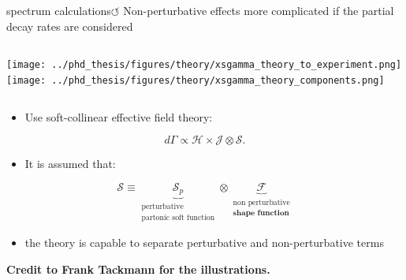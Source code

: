 \documentclass[xcolor=dvipsnames]{beamer}
\begin{document}
\begin{frame}{\safeBtoXsdgamma spectrum calculations\hyperlink{frame:A}{$\circlearrowleft$}}
   \scriptsize
      Non-perturbative effects more complicated if the partial decay rates are considered
   
      \begin{columns}
         \texttt{[image: ../phd\_thesis/figures/theory/xsgamma\_theory\_to\_experiment.png]}
         \texttt{[image: ../phd\_thesis/figures/theory/xsgamma\_theory\_components.png]}
      \end{columns}
   
      \begin{itemize}
         \item Use soft-collinear effective field theory:
      \end{itemize}
      \begin{equation}\nonumber
         d\Gamma \propto \mathcal{H} \times \mathcal{J} \otimes \mathcal{S}.
     \end{equation}

     \vspace{-10pt}
     \begin{itemize}
      \item It is assumed that:
     \end{itemize}
     \begin{equation}\nonumber
      \mathcal{S} \equiv \underbrace{\mathcal{S}_p}_{\substack{\text{perturbative}\\\text{partonic soft function}}} \otimes \underbrace{\mathcal{F}}_{\substack{\text{non perturbative}\\\textbf{shape function}}}
     \end{equation}
     \begin{itemize}
      \item[\ra] the theory is capable to separate perturbative and non-perturbative terms 
     \end{itemize}

   \vspace{-5pt}
   
   \begin{flushright}
      \tiny \textbf{Credit to Frank Tackmann for the illustrations.}
   \end{flushright}
   
   \end{frame}
\end{document}

